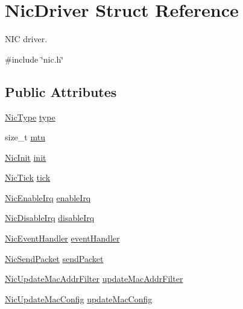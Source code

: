 \hypertarget{structNicDriver}{}\section{Nic\+Driver Struct Reference}
\label{structNicDriver}


N\+IC driver.  




{\ttfamily \#include \char`\"{}nic.\+h\char`\"{}}

\subsection*{Public Attributes}
\begin{DoxyCompactItemize}
\item 
\hyperlink{nic_8h_ac1ce8659a9797513ecd9cc1afedce40b}{Nic\+Type} \hyperlink{structNicDriver_a685aebf8f2369d307969e464d01a03ad}{type}
\item 
size\+\_\+t \hyperlink{structNicDriver_a8236221ef7d5a0a7fbcdae57374df759}{mtu}
\item 
\hyperlink{nic_8h_a8c65f971bb6fede1efeae1873a16841f}{Nic\+Init} \hyperlink{structNicDriver_a9d158b20de0996ab27a34b3305f9b05d}{init}
\item 
\hyperlink{nic_8h_a3f6714321f4ab9564fdac42ba69de526}{Nic\+Tick} \hyperlink{structNicDriver_a52cde3c20cfb4cf96d404c683596492a}{tick}
\item 
\hyperlink{nic_8h_a5287b4eea3f3d81a54e873acdf405c0f}{Nic\+Enable\+Irq} \hyperlink{structNicDriver_ae8cd31c34ee241b0ad9756400b0ebb5f}{enable\+Irq}
\item 
\hyperlink{nic_8h_a2838a247e625bd72c8214dac1d95c394}{Nic\+Disable\+Irq} \hyperlink{structNicDriver_a477327e03223c1f5a062e884bbde2c2f}{disable\+Irq}
\item 
\hyperlink{nic_8h_a64cc7ec2ef61ae3a5c36c2d52f52ae0e}{Nic\+Event\+Handler} \hyperlink{structNicDriver_a9f5931e1563daded83347864db7ec566}{event\+Handler}
\item 
\hyperlink{nic_8h_a63d88efa567d89b00e11faebabafa2e0}{Nic\+Send\+Packet} \hyperlink{structNicDriver_aded5f78ab18f7b2f1e65313434efafb9}{send\+Packet}
\item 
\hyperlink{nic_8h_a1e0d018c9a510a084370e7e8a354e54d}{Nic\+Update\+Mac\+Addr\+Filter} \hyperlink{structNicDriver_a4062e60f50c3a4e8977df0e468c856fc}{update\+Mac\+Addr\+Filter}
\item 
\hyperlink{nic_8h_a24c14c5747a3d68e12393a0bf9ede8fb}{Nic\+Update\+Mac\+Config} \hyperlink{structNicDriver_a5e331ca11852729ad484485d9e7cf3f2}{update\+Mac\+Config}

\end{DoxyCompactItemize}
